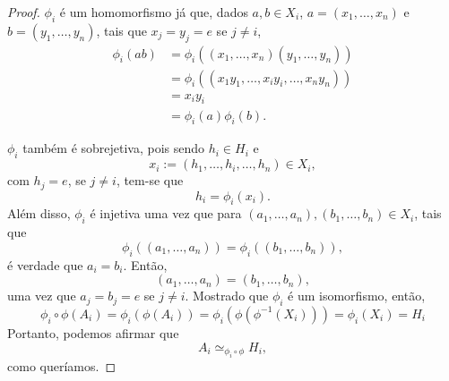 \documentclass[11pt,openany]{book}
\begin{document}
\begin{proof}
        $\phi_i$ é um homomorfismo já que, dados $a,b \in X_i$, $a = (x_1, \dots, x_n)$ e $b = (y_1, \dots, y_n)$, tais que $x_j = y_j = e$ se $j \not= i$,
        \begin{align*}
            \phi_i(ab) &= \phi_i((x_1, \dots, x_n)(y_1, \dots, y_n))\\
            &= \phi_i((x_1y_1, \dots, x_iy_i, \dots, x_ny_n))\\
            &= x_iy_i\\
            &= \phi_i(a)\phi_i(b).
        \end{align*}
        \par$\phi_i$ também é sobrejetiva, pois sendo $h_i \in H_i$ e
        \[x_i := (h_1, \dots, h_i, \dots, h_n) \in X_i,\]
        com $h_j = e$, se $j \not= i$, tem-se que
        \[h_i = \phi_i(x_i).\]
        Além disso, $\phi_i$ é injetiva uma vez que para $(a_1, \dots, a_n), (b_1, \dots, b_n) \in X_i$, tais que
        \[\phi_i((a_1, \dots, a_n)) = \phi_i((b_1, \dots, b_n)),\]
        é verdade que $a_i = b_i$. Então,
        \[(a_1, \dots, a_n) = (b_1, \dots, b_n),\]
        uma vez que $a_j = b_j = e$ se $j \not= i$.
        Mostrado que $\phi_i$ é um isomorfismo, então,
        \[\phi_i \circ \phi(A_i) = \phi_i(\phi(A_i)) = \phi_i(\phi(\phi^{-1}(X_i))) = \phi_i(X_i) = H_i\]
        Portanto, podemos afirmar que 
        \[A_i \simeq_{\phi_i \circ \phi} H_i,\]
        como queríamos.
        

\end{proof}
\end{document}
